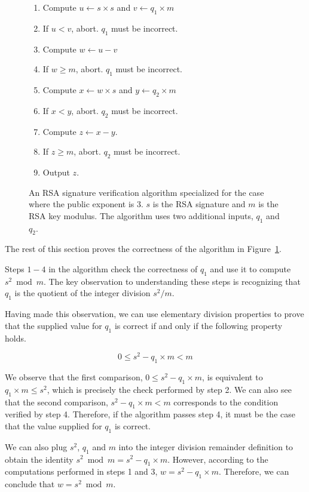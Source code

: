 \begin{figure}[hbt]
  \begin{enumerate}
    \item Compute $u \leftarrow s \times s$ and $v \leftarrow q_1 \times m$
    \item If $u < v$, abort. $q_1$ must be incorrect.
    \item Compute $w \leftarrow u - v$
    \item If $w \ge m$, abort. $q_1$ must be incorrect.
    \item Compute $x \leftarrow w \times s$ and $y \leftarrow q_2 \times m$
    \item If $x < y$, abort. $q_2$ must be incorrect.
    \item Compute $z \leftarrow x - y$.
    \item If $z \ge m$, abort. $q_2$ must be incorrect.
    \item Output $z$.
  \end{enumerate}
  \caption{
    An RSA signature verification algorithm specialized for the case where
    the public exponent is 3. $s$ is the RSA signature and $m$ is the RSA key
    modulus. The algorithm uses two additional inputs, $q_1$ and $q_2$.
  }
  \label{fig:sgx_sig_verification}
\end{figure}

The rest of this section proves the correctness of the algorithm in
Figure~\ref{fig:sgx_sig_verification}.



Steps $1 - 4$ in the algorithm check the correctness of $q_1$ and use it
to compute $s^2 \bmod m$. The key observation to understanding these steps is
recognizing that $q_1$ is the quotient of the integer division $s^2 / m$.

Having made this observation, we can use elementary division properties to
prove that the supplied value for $q_1$ is correct if and only if the following
property holds.

$$ 0 \le s^2 - q_1 \times m < m $$

We observe that the first comparison, $0 \le s^2 - q_1 \times m$, is equivalent
to $q_1 \times m \le s^2$, which is precisely the check performed by step 2. We
can also see that the second comparison, $s^2 - q_1 \times m < m$ corresponds
to the condition verified by step 4. Therefore, if the algorithm passes step 4,
it must be the case that the value supplied for $q_1$ is correct.

We can also plug $s^2$, $q_1$ and $m$ into the integer division remainder
definition to obtain the identity $s^2 \bmod m = s^2 - q_1 \times m$. However,
according to the computations performed in steps 1 and 3,
$w = s^2 - q_1 \times m$. Therefore, we can conclude that $w = s^2 \bmod m$.


